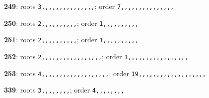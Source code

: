 \noindent \textbf{249}: roots \texttt{3,,,,,,,,,,,,,,,}; order \texttt{7,,,,,,,,,,,,,,,}\par
\noindent \textbf{250}: roots \texttt{2,,,,,,,,,,}; order \texttt{1,,,,,,,,,,}\par
\noindent \textbf{251}: roots \texttt{2,,,,,,,,,,}; order \texttt{1,,,,,,,,,,}\par
\noindent \textbf{252}: roots \texttt{2,,,,,,,,,,,,,,,,,}; order \texttt{1,,,,,,,,,,,,,,,,,}\par
\noindent \textbf{253}: roots \texttt{4,,,,,,,,,,,,,,,,,,,}; order \texttt{19,,,,,,,,,,,,,,,,,,,}\par
\noindent \textbf{339}: roots \texttt{3,,,,,,,,}; order \texttt{4,,,,,,,,}\par
